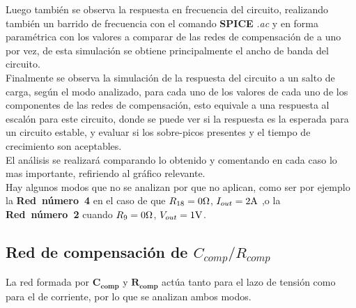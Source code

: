 Luego también se observa la respuesta en frecuencia del circuito, realizando también un barrido de frecuencia con el comando \textbf{SPICE} \textit{.ac} y en forma paramétrica con los valores a comparar de las redes de compensación de a uno por vez, de esta simulación se obtiene principalmente el ancho de banda del circuito.\\

Finalmente se observa la simulación de la respuesta del circuito a un salto de carga, según el modo analizado, para cada uno de los valores de cada uno de los componentes de las redes de compensación, esto equivale a una respuesta al escalón para este circuito, donde se puede ver si la respuesta es la esperada para un circuito estable, y evaluar si los sobre-picos presentes y el tiempo de crecimiento son aceptables.\\

El análisis se realizará comparando lo obtenido y comentando en cada caso lo mas importante, refiriendo al gráfico relevante.\\

Hay algunos modos que no se analizan por que no aplican, como ser por ejemplo la \textbf{Red~número~4} en el caso de que $R_{18} = 0 \si[per-mode=symbol]{\ohm}$, $I_{out} = 2 \si[per-mode=symbol]{\ampere}$ ,o la \textbf{Red~número~2} cuando $R_{9} = 0 \si[per-mode=symbol]{\ohm}$, $V_{out} = 1 \si[per-mode=symbol]{\volt}$.





\clearpage


\subsection{Red de compensación de $C_{comp}/R_{comp}$}

La red formada por $\bm{C_{comp}}$ y $\bm{R_{comp}}$ actúa tanto para el lazo de tensión como para el de corriente, por lo que se analizan ambos modos.


